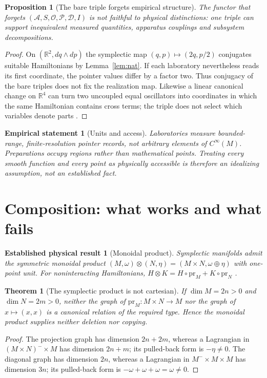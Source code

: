 \documentclass[12pt,a4paper]{article}
\theoremstyle{definition}
\theoremstyle{plain}
\newtheorem{proposition}[definition]{Proposition}
\newtheorem{theorem}[definition]{Theorem}
\theoremstyle{commentary}
\newtheorem{empirical}[definition]{Empirical statement}
\newtheorem{established}[definition]{Established physical result}
\newcommand{\R}{\mathbb{R}}
\newcommand{\Cinf}{C^{\infty}}
\newcommand{\Oc}{\mathcal O}
\begin{document}
\begin{proposition}[The bare triple forgets empirical structure]\label{prop:forget}
The functor that forgets $(\mathcal A,S,\Oc,\mathcal P,\mathcal D,I)$ is not faithful to
physical distinctions: one triple can support inequivalent measured quantities, apparatus
couplings and subsystem decompositions.
\end{proposition}
\begin{proof}
On $(\R^2,dq\wedge dp)$ the symplectic map $(q,p)\mapsto(2q,p/2)$ conjugates suitable
Hamiltonians by Lemma~\ref{lem:nat}.  If each laboratory nevertheless reads its first coordinate,
the pointer values differ by a factor two.  Thus conjugacy of the bare triples does not fix the
realization map.  Likewise a linear canonical change on $\R^4$ can turn two uncoupled equal
oscillators into coordinates in which the same Hamiltonian contains cross terms; the triple
does not select which variables denote parts \cite{PilotI}.
\end{proof}

\begin{empirical}[Units and access]
Laboratories measure bounded-range, finite-resolution pointer records, not arbitrary elements
of $\Cinf(M)$.  Preparations occupy regions rather than mathematical points.  Treating every
smooth function and every point as physically accessible is therefore an idealizing assumption,
not an established fact.
\end{empirical}

\section{Composition: what works and what fails}

\begin{established}[Monoidal product]
Symplectic manifolds admit the symmetric monoidal product
$(M,\omega)\otimes(N,\eta)=(M\times N,\omega\oplus\eta)$ with one-point unit.  For
noninteracting Hamiltonians, $H\otimes K=H\circ\mathrm{pr}_M+K\circ\mathrm{pr}_N$
\cite{AbrahamMarsden1978}.
\end{established}

\begin{theorem}[The symplectic product is not cartesian]\label{thm:notcart}
If $\dim M=2n>0$ and $\dim N=2m>0$, neither the graph of
$\mathrm{pr}_M:M\times N\to M$ nor the graph of $x\mapsto(x,x)$ is a canonical relation of
the required type.  Hence the monoidal product supplies neither deletion nor copying.
\end{theorem}
\begin{proof}
The projection graph has dimension $2n+2m$, whereas a Lagrangian in
$(M\times N)^-\times M$ has dimension $2n+m$; its pulled-back form is $-\eta\ne0$.
The diagonal graph has dimension $2n$, whereas a Lagrangian in $M^-\times M\times M$ has
dimension $3n$; its pulled-back form is $-\omega+\omega+\omega=\omega\ne0$.
\end{proof}
\end{document}
